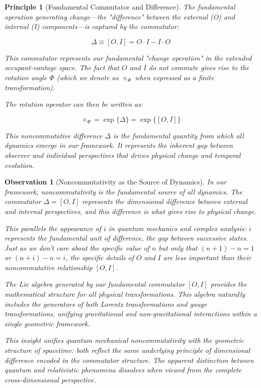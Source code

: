 \documentclass{article}
\newtheorem{observation}{Observation}
\newtheorem{principle}{Principle}
\begin{document}
\begin{principle}[Fundamental Commutator and Difference]
The fundamental operation generating change—the "difference" between the external (O) and internal (I) components—is captured by the commutator:

\begin{equation}
\Delta \equiv [O, I] = O \cdot I - I \cdot O
\end{equation}

This commutator represents our fundamental "change operation" in the extended occupant-vantage space. The fact that $O$ and $I$ do not commute gives rise to the rotation angle $\Phi$ (which we denote as $\times_\Phi$ when expressed as a finite transformation).

The rotation operator can then be written as:

\begin{equation}
\times_\Phi = \exp\{\Delta\} = \exp\{[O,I]\}
\end{equation}

This noncommutative difference $\Delta$ is the fundamental quantity from which all dynamics emerge in our framework. It represents the inherent gap between observer and individual perspectives that drives physical change and temporal evolution.
\end{principle}

\begin{observation}[Noncommutativity as the Source of Dynamics]
In our framework, noncommutativity is the fundamental source of all dynamics. The commutator $\Delta = [O, I]$ represents the dimensional difference between external and internal perspectives, and this difference is what gives rise to physical change.

This parallels the appearance of $i$ in quantum mechanics and complex analysis: $i$ represents the fundamental unit of difference, the gap between successive states. Just as we don't care about the specific value of $n$ but only that $(n+1) - n = 1$ or $(n+i) - n = i$, the specific details of $O$ and $I$ are less important than their noncommutative relationship $[O, I]$.

The Lie algebra generated by our fundamental commutator $[O, I]$ provides the mathematical structure for all physical transformations. This algebra naturally includes the generators of both Lorentz transformations and gauge transformations, unifying gravitational and non-gravitational interactions within a single geometric framework.

This insight unifies quantum mechanical noncommutativity with the geometric structure of spacetime: both reflect the same underlying principle of dimensional difference encoded in the commutator structure. The apparent distinction between quantum and relativistic phenomena dissolves when viewed from the complete cross-dimensional perspective.
\end{observation}
\end{document}
